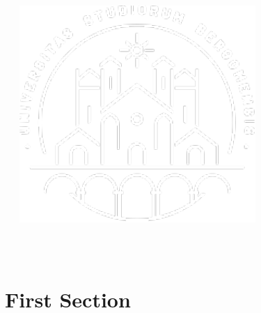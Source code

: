 \documentclass[aspectratio  =  169, 15pt]{beamer}
\author{\large\myauthor}
\date{\mydateofpublishing}
\begin{document}
    \begin{frame}[standout]
        \normalfont
        \textsc{\mydocumenttitle}
        
        \small\normalfont\mydocumentsubtitle
        \vspace*{0.5cm}
        \begin{columns}[t]
                \begin{center}
                    \textcolor{whitesmoke}{\large\myauthor}
                    
                    \textcolor{whitesmoke}{\mydateofpublishing}
                \end{center}
                
                \begin{center}
                    \includegraphics[width  =  0.15\paperwidth]{images/LogoUniBGwhite.pdf}
                    
                    \textcolor{whitesmoke}{\footnotesize\myinstitution\\\scriptsize\myinstitutiondepartment}
                \end{center}
        \end{columns}
    \end{frame}
    
    \section{First Section}
    
\end{document}
